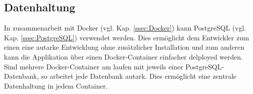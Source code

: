 \subsection{Datenhaltung}
\label{ssec:Datenhaltung}

In zusammenarbeit mit Docker (vgl. Kap. \vref{ssec:Docker}) kann PostgreSQL (vgl. Kap. \vref{ssec:PostgreSQL}) verwendet werden.
Dies ermöglicht dem Entwickler zum einen eine autarke Entwicklung ohne zusätzlicher Installation und zum anderen kann die Applikation über einen Docker-Container einfacher delployed werden.
Sind mehrere Docker-Container am laufen mit jeweils einer PostgreSQL-Datenbank, so arbeitet jede Datenbank autark.
Dies ermöglicht eine zentrale Datenhaltung in jedem Container.

